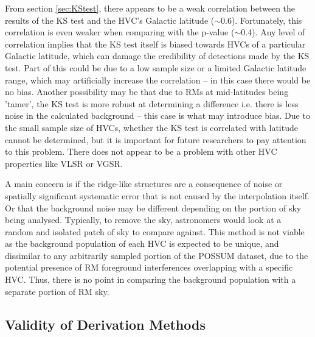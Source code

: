 From section \ref{sec:KStest}, there appears to be a weak correlation between the results of the KS test and the HVC's Galactic latitude ($\sim$0.6). Fortunately, this correlation is even weaker when comparing with the p-value ($\sim$0.4). Any level of correlation implies that the KS test itself is biased towards HVCs of a particular Galactic latitude, which can damage the credibility of detections made by the KS test. Part of this could be due to a low sample size or a limited Galactic latitude range, which may artificially increase the correlation – in this case there would be no bias. Another possibility may be that due to RMs at mid-latitudes being 'tamer', the KS test is more robust at determining a difference i.e. there is less noise in the calculated background – this case is what may introduce bias. Due to the small sample size of HVCs, whether the KS test is correlated with latitude cannot be determined, but it is important for future researchers to pay attention to this problem. There does not appear to be a problem with other HVC properties like VLSR or VGSR.


A main concern is if the ridge-like structures are a consequence of noise or spatially significant systematic error that is not caused by the interpolation itself. Or that the background noise may be different depending on the portion of sky being analysed. Typically, to remove the sky, astronomers would look at a random and isolated patch of sky to compare against. This method is not viable as the background population of each HVC is expected to be unique, and dissimilar to any arbitrarily sampled portion of the POSSUM dataset, due to the potential presence of RM foreground interferences overlapping with a specific HVC. Thus, there is no point in comparing the background population with a separate portion of RM sky.

\subsection{Validity of Derivation Methods}
\label{ssec:B3}

